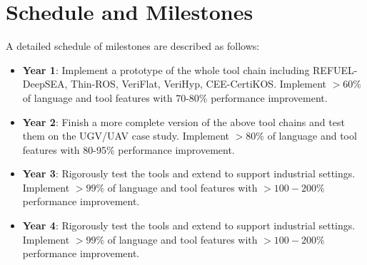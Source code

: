 \section{Schedule and Milestones}

A detailed schedule of milestones are described as follows:
\begin{itemize}[leftmargin=*]
 \item {\bf Year 1}: Implement a prototype of the whole
   tool chain including REFUEL-DeepSEA, Thin-ROS, VeriFlat, VeriHyp,
   CEE-CertiKOS.
   Implement $>60\%$ of language and tool features with 70-80\% performance
   improvement. 
 \item {\bf Year 2}: Finish a more complete version of
   the above tool chains and test them on the UGV/UAV case study.  %
   Implement $>80\%$ of language and tool features with 80-95\% performance
   improvement. 
\item {\bf Year 3}: Rigorously test the tools and extend
  to support industrial settings. Implement $>99\%$ of language and tool
  features with $>100-200\%$ performance improvement.
\item {\bf Year 4}: Rigorously test the tools and extend
  to support industrial settings. Implement $>99\%$ of language and tool
  features with $>100-200\%$ performance improvement.
\end{itemize}

